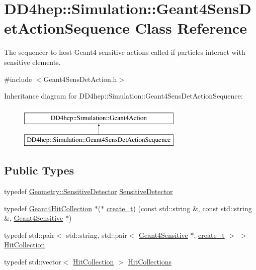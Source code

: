 \hypertarget{class_d_d4hep_1_1_simulation_1_1_geant4_sens_det_action_sequence}{}\section{D\+D4hep\+:\+:Simulation\+:\+:Geant4\+Sens\+Det\+Action\+Sequence Class Reference}
\label{class_d_d4hep_1_1_simulation_1_1_geant4_sens_det_action_sequence}


The sequencer to host Geant4 sensitive actions called if particles interact with sensitive elements.  




{\ttfamily \#include $<$Geant4\+Sens\+Det\+Action.\+h$>$}

Inheritance diagram for D\+D4hep\+:\+:Simulation\+:\+:Geant4\+Sens\+Det\+Action\+Sequence\+:\begin{figure}[H]
\begin{center}
\leavevmode
\includegraphics[height=2.000000cm]{class_d_d4hep_1_1_simulation_1_1_geant4_sens_det_action_sequence}
\end{center}
\end{figure}
\subsection*{Public Types}
\begin{DoxyCompactItemize}
\item 
typedef \hyperlink{class_d_d4hep_1_1_geometry_1_1_sensitive_detector}{Geometry\+::\+Sensitive\+Detector} \hyperlink{class_d_d4hep_1_1_simulation_1_1_geant4_sens_det_action_sequence_a9d428afdc7b9189bce5dab4f16db17fb}{Sensitive\+Detector}
\item 
typedef \hyperlink{class_d_d4hep_1_1_simulation_1_1_geant4_hit_collection}{Geant4\+Hit\+Collection} $\ast$($\ast$ \hyperlink{class_d_d4hep_1_1_simulation_1_1_geant4_sens_det_action_sequence_a449bfc3938d1e870ce8af2e80c16f25f}{create\+\_\+t}) (const std\+::string \&, const std\+::string \&, \hyperlink{class_d_d4hep_1_1_simulation_1_1_geant4_sensitive}{Geant4\+Sensitive} $\ast$)
\item 
typedef std\+::pair$<$ std\+::string, std\+::pair$<$ \hyperlink{class_d_d4hep_1_1_simulation_1_1_geant4_sensitive}{Geant4\+Sensitive} $\ast$, \hyperlink{class_d_d4hep_1_1_simulation_1_1_geant4_sens_det_action_sequence_a449bfc3938d1e870ce8af2e80c16f25f}{create\+\_\+t} $>$ $>$ \hyperlink{class_d_d4hep_1_1_simulation_1_1_geant4_sens_det_action_sequence_ac2b994581eab7aad3b5473ac416f65fd}{Hit\+Collection}
\item 
typedef std\+::vector$<$ \hyperlink{class_d_d4hep_1_1_simulation_1_1_geant4_sens_det_action_sequence_ac2b994581eab7aad3b5473ac416f65fd}{Hit\+Collection} $>$ \hyperlink{class_d_d4hep_1_1_simulation_1_1_geant4_sens_det_action_sequence_aabeb325e4b6af156cbae3578b00301b3}{Hit\+Collections}
\end{DoxyCompactItemize}
